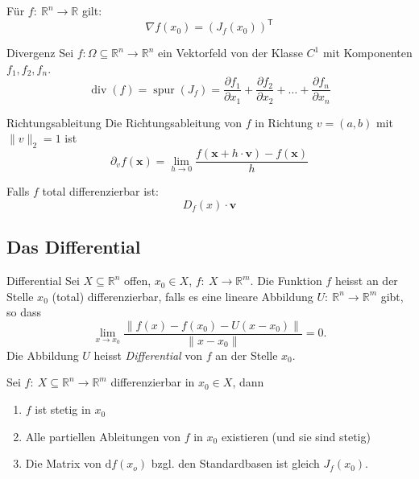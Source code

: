 \documentclass[a4paper,10pt]{article}
\def\R{\mathbb{R}}
\def\T{\mathsf{T}}
\DeclareMathOperator{\spur}{spur}
\DeclareMathOperator{\divergenz}{div}
\begin{document}
Für \( f: \: \R^n \to \R \) gilt:
\[ \nabla f(x_0) = (J_f(x_0))^\T \]

\begin{mainbox}{Divergenz}
    Sei \( f: \Omega \subseteq \R^n \to \R^n \) ein Vektorfeld von der Klasse \( C^1 \) mit Komponenten \( f_1, f_2, f_n \).
    \[
        \divergenz(f) = \spur(J_f) = \frac{\partial f_1}{\partial x_1} + \frac{\partial f_2}{\partial x_2} + \dots + \frac{\partial f_n}{\partial x_n}
    \]
\end{mainbox}

\begin{mainbox}{Richtungsableitung}
    Die Richtungsableitung von \( f \) in Richtung \( v = (a, b) \) mit \( \| v \|_2 = 1 \) ist
    \[
        \partial_v f(\mathbf{x}) = \lim_{h \to 0} \frac{f(\mathbf{x} + h \cdot \mathbf{v}) - f(\mathbf{x})}{h}
    \]
\end{mainbox}

Falls \( f \) total differenzierbar ist:
\[
    D_f(x) \cdot \mathbf{v}
\]


\subsection{Das Differential}

\begin{mainbox}{Differential}
    Sei \( X \subseteq \R^n \) offen, \( x_0 \in X \), \( f: \: X \to \R^m \). Die Funktion \( f \) heisst an der Stelle \( x_0 \) (total) differenzierbar, falls es eine lineare Abbildung \( U: \: \R^n \to \R^m \) gibt, so dass \[
        \lim_{x \to x_0} \frac{\| f(x) - f(x_0) - U(x - x_0) \|}{\| x - x_0 \|} = 0 \text{.}
    \]
    Die Abbildung \( U \) heisst \emph{Differential} von \( f \) an der Stelle \( x_0 \).
\end{mainbox}

\begin{subbox}{}
    Sei \( f: \: X \subseteq \R^n \to \R^m \) differenzierbar in \( x_0 \in X \), dann \begin{enumerate}
        \item \( f \) ist stetig in \( x_0 \)
        \item Alle partiellen Ableitungen von \( f \) in \( x_0 \) existieren (und sie sind stetig)
        \item Die Matrix von \( \mathrm{d}f(x_o) \) bzgl. den Standardbasen ist gleich \( J_f(x_0) \).
    \end{enumerate}
\end{subbox}
\end{document}
